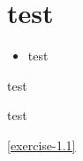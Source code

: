 \documentclass{article}
\begin{document}
\tableofcontents

\section{test}
\exercisesheet

\begin{sheetexercise}
    \begin{itemize}
        \item test
    \end{itemize}
    test
\end{sheetexercise}

\begin{sheetexercise}
    test
\end{sheetexercise}

\exercisesheet

\begin{sheetexercise}
    
\end{sheetexercise}

\autoref{exercise-1.1} 
\end{document}

